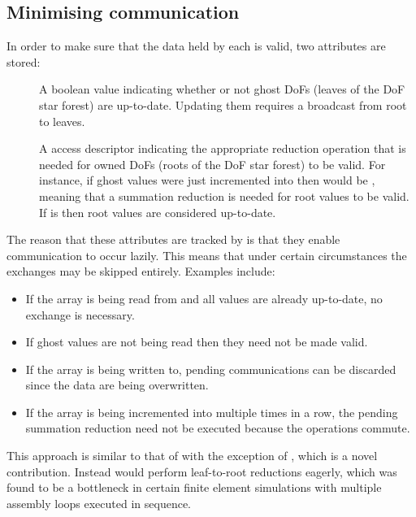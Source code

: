 \documentclass[thesis]{subfiles}
\begin{document}
\subsection{Minimising communication}
\label{sec:parallel_minimising_communication}

In order to make sure that the data held by each  is valid, two attributes are stored:
\begin{description}
  \item[]
    A boolean value indicating whether or not ghost DoFs (leaves of the DoF star forest) are up-to-date.
    Updating them requires a broadcast from root to leaves.

  \item[]
    A  access descriptor indicating the appropriate reduction operation that is needed for owned DoFs (roots of the DoF star forest) to be valid.
    For instance, if ghost values were just incremented into then  would be , meaning that a summation reduction is needed for root values to be valid.
    If  is  then root values are considered up-to-date.
\end{description}

The reason that these attributes are tracked by  is that they enable communication to occur lazily.
This means that under certain circumstances the exchanges may be skipped entirely.
Examples include:
\begin{itemize}
  \item If the array is being read from and all values are already up-to-date, no exchange is necessary.
  \item If ghost values are not being read then they need not be made valid.
  \item If the array is being written to, pending communications can be discarded since the data are being overwritten.
  \item If the array is being incremented into multiple times in a row, the pending summation reduction need not be executed because the operations commute.
\end{itemize}

This approach is similar to that of  with the exception of , which is a novel contribution.
Instead  would perform leaf-to-root reductions eagerly, which was found to be a bottleneck in certain finite element simulations with multiple assembly loops executed in sequence.
\end{document}
